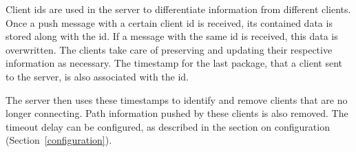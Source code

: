 Client ids are used in the server to differentiate information from different clients.
Once a push message with a certain client id is received, its contained data is stored along with the id.
If a message with the same id is received, this data is overwritten.
The clients take care of preserving and updating their respective information as necessary.
The timestamp for the last package, that a client sent to the server, is also associated with the id.

The server then uses these timestamps to identify and remove clients that are no longer connecting.
Path information pushed by these clients is also removed.
The timeout delay can be configured, as described in the section on configuration (Section~\ref{configuration}).
